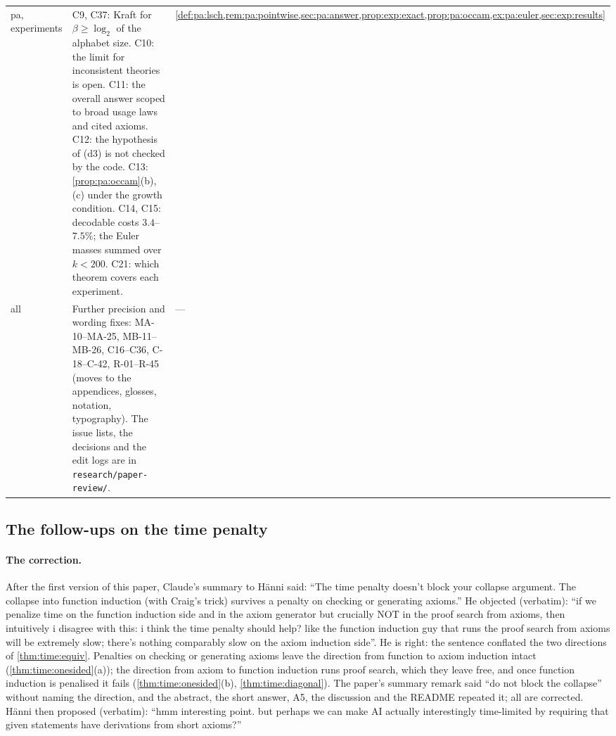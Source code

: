 {\begin{longtable}{@{}>{\raggedright\arraybackslash}p{1.8cm}>{\raggedright\arraybackslash}p{10.8cm}>{\raggedright\arraybackslash}p{2.4cm}@{}}
pa, experiments & C9, C37: Kraft for $\beta\ge\log_2$ of the alphabet size. C10: the limit for inconsistent theories is open. C11: the overall answer scoped to broad usage laws and cited axioms. C12: the hypothesis of (d3) is not checked by the code. C13: \cref{prop:pa:occam}(b), (c) under the growth condition. C14, C15: decodable costs $3.4$--$7.5\%$; the Euler masses summed over $k<200$. C21: which theorem covers each experiment. & \cref{def:pa:lsch,rem:pa:pointwise,sec:pa:answer,prop:exp:exact,prop:pa:occam,ex:pa:euler,sec:exp:results}\\
all & Further precision and wording fixes: MA-10--MA-25, MB-11--MB-26, C16--C36, C-18--C-42, R-01--R-45 (moves to the appendices, glosses, notation, typography). The issue lists, the decisions and the edit logs are in \texttt{research/paper-review/}. & ---\\
\end{longtable}
}

\subsection{The follow-ups on the time penalty}\label{app:ver:followups}

\paragraph{The correction.} After the first version of this paper, Claude's summary to H\"anni said: ``The time penalty doesn't block your collapse argument. The collapse into function induction (with Craig's trick) survives a penalty on checking or generating axioms.'' He objected (verbatim): ``if we penalize time on the function induction side and in the axiom generator but crucially NOT in the proof search from axioms, then intuitively i disagree with this: i think the time penalty should help? like the function induction guy that runs the proof search from axioms will be extremely slow; there's nothing comparably slow on the axiom induction side''. He is right: the sentence conflated the two directions of \cref{thm:time:equiv}. Penalties on checking or generating axioms leave the direction from function to axiom induction intact (\cref{thm:time:onesided}(a)); the direction from axiom to function induction runs proof search, which they leave free, and once function induction is penalised it fails (\cref{thm:time:onesided}(b), \cref{thm:time:diagonal}). The paper's summary remark said ``do not block the collapse'' without naming the direction, and the abstract, the short answer, A5, the discussion and the README repeated it; all are corrected. H\"anni then proposed (verbatim): ``hmm interesting point. but perhaps we can make AI actually interestingly time-limited by requiring that given statements have derivations from short axioms?''

